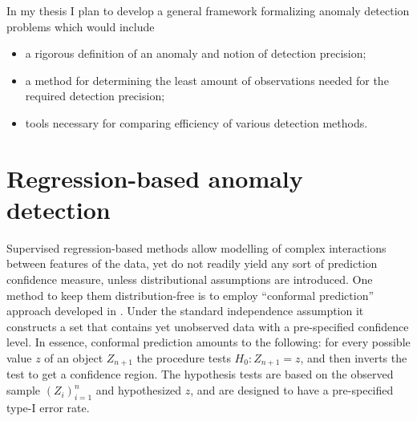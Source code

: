 \documentclass{extarticle}
\begin{document}
In my thesis I plan to develop a general framework formalizing anomaly detection
problems which would include\begin{itemize}
  \item a rigorous definition of an anomaly and notion of detection precision;
  \item a method for determining the least amount of observations needed for the
  required detection precision;
  \item tools necessary for comparing efficiency of various detection methods.
\end{itemize}


\section{Regression-based anomaly detection} %
\label{sec:regression_based_anomaly_detection}


Supervised regression-based methods allow modelling of complex interactions between
features of the data, yet do not readily yield any sort of prediction confidence
measure, unless distributional assumptions are introduced. One method to keep them
distribution-free is to employ ``conformal prediction'' approach developed in \cite{vovk2005}.
Under the standard independence assumption it constructs a set that contains yet
unobserved data with a pre-specified confidence level. In essence, conformal prediction
amounts to the following: for every possible value $z$ of an object $Z_{n+1}$ the
procedure tests $H_0: Z_{n+1}=z$, and then inverts the test to get a confidence
region. The hypothesis tests are based on the observed sample $(Z_i)_{i=1}^n$ and
hypothesized $z$, and are designed to have a pre-specified type-I error rate.
\end{document}
